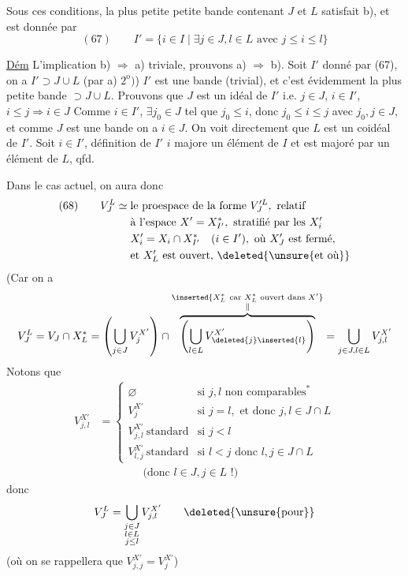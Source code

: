 Sous ces conditions,    la plus petite petite bande  contenant $J$ et $L$ satisfait b), et est donnée par
\[
(67)\qquad I'=\{i\in I\mid\exists j\in J,l\in L\text{ avec }j\leq i\leq l\}
\]

\uline{Dém} L'implication b) $\Rightarrow$ a) triviale,  prouvons a) $\Rightarrow$ b). Soit $I'$ donné par (67), on a $I'\supset J\cup L$ (par a) $2^{\mathrm o})$) $I'$ est une bande (trivial), et c'est évidemment la plus petite bande $\supset J\cup L$. Prouvons que $J$ est un idéal de $I'$ i.e. $j\in J$, $i\in I'$, $i\leq j\Rightarrow i\in J$ Comme $i\in I'$, $\exists j_0\in J$ tel que $j_0\leq i$, donc $j_0\leq i\leq j$ avec $j_0,j\in J$, et comme $J$ est une bande  on a $i\in J$. On voit directement que $L$ est un coidéal de $I'$. Soit $i\in I'$,   définition de $I'$ $i$ majore un élément de $I$ et est majoré par un élément de $L$, qfd.


Dans le cas actuel, on aura donc
\[
\begin{aligned}
(68)\qquad V_J^L\simeq{}&\text{le proespace de la forme }V_J^{\prime L},\text{ relatif}\\
&\text{à l'espace }X'=X_{I'}^*,\text{ stratifié par les }X_i'\\
&X_i'=X_i\cap X_{I'}^*\quad(i\in I'),\text{ où }X_J'\text{ est fermé,}\\
&\text{et }X_L'\text{ est ouvert, }\deleted{\unsure{\text{et où}}}
\end{aligned}
\]
(Car on a
\[
V_J^L=V_J\cap X_L^*
=\left(\bigcup_{j\in J}V_j^{X'}\right)\cap
\overbrace{\left(\bigcup_{l\in L}V_{\deleted{j}\inserted{l}}^{X'}\right)}^{\substack{\inserted{X_L^*\ \text{car }X_L^*\text{ ouvert dans }X'}\\\Vert}}
=\bigcup_{j\in J,l\in L}V_{j,l}^{X'}
\]
Notons que
\[
\begin{aligned}
V_{j,l}^{X'}&=
\begin{cases}
\varnothing&\text{si }j,l\text{ non comparables}^*\\
V_j^{X'}&\text{si }j=l,\text{ et donc }j,l\in J\cap L\\
V_{j,l}^{X'}\ \text{standard}&\text{si }j<l\\
V_{l,j}^{X'}\ \text{standard}&\text{si }l<j\text{ donc }l,j\in J\cap L
\end{cases}\\
&\qquad\qquad\text{(donc }l\in J,j\in L\text{ !)}
\end{aligned}
\]
donc
\[
V_J^L=\bigcup_{\substack{j\in J\\l\in L\\j\leq l}}V_{j,l}^{X'}\qquad\deleted{\text{\unsure{pour}}}
\]
(où on se rappellera que $V_{j,j}^{X'}=V_j^{X'}$)

